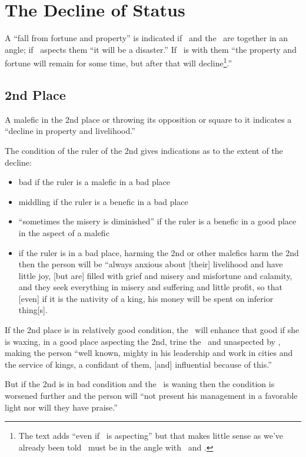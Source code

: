 \section{The Decline of Status}

A ``fall from fortune and property'' is indicated if \Saturn\, and the \Moon\, are together in an angle; if \Mars\, aspects them ``it will be a disaster.'' If \Jupiter\, is with them ``the property and fortune will remain for some time, but after that will decline\footnote{The text adds ``even if \Jupiter\, is aspecting'' but that makes little sense as we've already been told \Jupiter\, must be in the angle with \Saturn\, and \Mars.}.''

\subsection{2nd Place}
A malefic in the 2nd place or throwing its opposition or square to it indicates a ``decline in property and livelihood.''

The condition of the ruler of the 2nd gives indications as to the extent of the decline:
\begin{itemize}[topsep=0em,itemsep=0em]
\item bad if the ruler is a malefic in a bad place
\item middling if the ruler is a benefic in a bad place
\item ``sometimes the misery is diminished'' if the ruler is a benefic in a good place in the aspect of a malefic
\item if the ruler is in a bad place, harming the 2nd or other malefics harm the 2nd then the person will be ``always anxious about [their] livelihood and have little joy, [but are] filled with grief and misery and misfortune and calamity, and they seek everything in misery and suffering and little profit, so that [even] if it is the nativity of a king, his money will be spent on inferior thing[s].
\end{itemize}

If the 2nd place is in relatively good condition, the \Moon\, will enhance that good if she is waxing, in a good place aspecting the 2nd, trine the \Sun\, and unaspected by \Mars, making the person ``well known, mighty in his leadership and work in cities and the service of kings, a confidant of them, [and] influential because of this.''

But if the 2nd is in bad condition and the \Moon\, is waning then the condition is worsened further and the person will ``not present his management in a favorable light nor will they have praise.''

